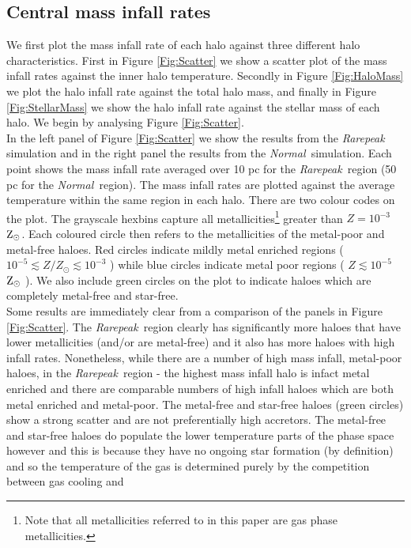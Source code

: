 \documentclass[graphics, twocolumn, usenatbib]{mn2e}
\newcommand{\zsolar} {$\rm{Z_{\odot}}~$}
\newcommand{\zsolarc} {$\rm{Z_{\odot}}$}
\newcommand{\rarepeak} {\textit{Rarepeak~}}
\newcommand{\normal} {\textit{Normal~}}
\begin{document}
\subsection{Central mass infall rates}
\indent We first plot the mass infall rate of each halo against three different halo
characteristics. First in Figure \ref{Fig:Scatter} we show a scatter plot of the mass infall rates
against the inner halo temperature. Secondly in Figure \ref{Fig:HaloMass} we plot the halo infall
rate against the total halo mass, and finally in Figure  \ref{Fig:StellarMass} we show the halo
infall rate against the stellar mass of each halo. We begin by analysing Figure \ref{Fig:Scatter}. \\
\indent In the left panel of Figure \ref{Fig:Scatter} we show the results from the \rarepeak
simulation and in the right panel the results from the \normal simulation. Each point shows the mass
infall rate averaged over 10 pc for the \rarepeak region (50 pc
for the \normal region). The mass infall rates are plotted against the average temperature within
the same region in each halo. There are two colour codes on the plot. The grayscale
hexbins capture all metallicities\footnote{Note that all metallicities
  referred to in this paper are gas phase metallicities.}
greater than $Z = 10^{-3}$ \zsolarc. Each coloured circle then refers to
the metallicities of the metal-poor and metal-free haloes. Red circles indicate
mildly metal enriched regions ( $10^{-5} \lesssim Z/Z_\odot \lesssim 10^{-3}$ )  while blue circles
indicate metal poor regions  ( $Z \lesssim 10^{-5}$ \zsolar ). We also include green circles
on the plot to indicate haloes which are completely metal-free and star-free. \\
\indent Some results are immediately clear from a comparison of the panels in Figure
\ref{Fig:Scatter}. The \rarepeak region clearly has significantly more haloes that have lower
metallicities (and/or are metal-free) and it also has more haloes
with high infall rates. Nonetheless, while there are a number of high mass infall,
metal-poor haloes, in the \rarepeak region - the highest mass infall halo is infact metal enriched
and there are comparable numbers of high infall haloes which are both metal enriched and metal-poor.
The metal-free and star-free haloes (green circles) show a strong scatter and are not preferentially
high accretors. The metal-free and star-free haloes do populate the lower temperature parts of the
phase space however and this is because they have no ongoing star formation (by definition) and so
the temperature of the gas is determined purely by the competition between gas cooling and
\end{document}
